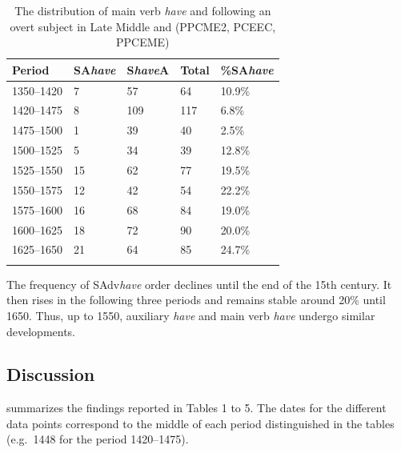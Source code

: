 \documentclass[output=paper]{langsci/langscibook}
\begin{document}
\begin{table}
\caption{The distribution of main verb \emph{have} and  following an
overt subject in Late Middle and  (PPCME2, PCEEC, PPCEME)}
\label{tab:key:09.5}
\begin{tabularx}{\textwidth}{lXXXX}
\lsptoprule
\textbf{Period} & \textbf{SA\emph{have}} & \textbf{S\emph{have}A} & \textbf{Total} & \textbf{\%SA\emph{have}}\\
\midrule
1350--1420 & 7 & 57 & 64 & 10.9\%\\
1420--1475 & 8 & 109 & 117 & 6.8\%\\
1475--1500 & 1 & 39 & 40 & 2.5\%\\
1500--1525 & 5 & 34 & 39 & 12.8\%\\
1525--1550 & 15 & 62 & 77 & 19.5\%\\
1550--1575 & 12 & 42 & 54 & 22.2\%\\
1575--1600 & 16 & 68 & 84 & 19.0\%\\
1600--1625 & 18 & 72 & 90 & 20.0\%\\
1625--1650 & 21 & 64 & 85 & 24.7\%\\
\lspbottomrule
\end{tabularx}
\end{table}

The frequency of SAdv\emph{have} order declines until the end of the 15th
century. It then rises in the following three periods and remains stable around
20\% until 1650. Thus, up to 1550, auxiliary \emph{have} and main verb
\emph{have} undergo similar developments.

\subsection{Discussion}

 summarizes the findings reported in Tables 1 to 5. The dates
for the different data points correspond to the middle of each period
distinguished in the tables (e.g.\ 1448 for the period 1420--1475).
\end{document}
